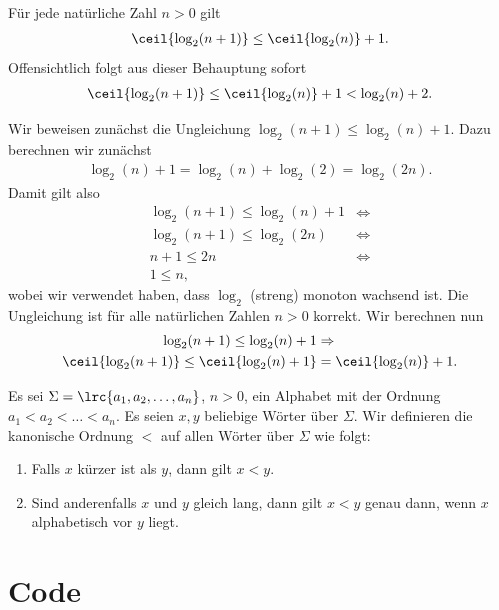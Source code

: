 \begin{mytheorem}\label{mytheorem:Estimate}
	Für jede natürliche Zahl $n>0$ gilt
	\begin{align*}
		\ceil{\log_2(n+1)}\leq \ceil{\log_2(n)} + 1.
	\end{align*}
	Offensichtlich folgt aus dieser Behauptung sofort
	\begin{align*}
		\ceil{\log_2(n+1)}\leq \ceil{\log_2(n)} + 1 < \log_2(n) + 2.
	\end{align*}
	\begin{myproof}
		Wir beweisen zunächst die Ungleichung $\log_2(n+1) \leq \log_2(n) + 1$. Dazu berechnen wir zunächst
		\begin{align*}
			\log_2(n) + 1 = \log_2(n) + \log_2(2) = \log_2(2n).
		\end{align*}
		Damit gilt also
		\begin{align*}
			\log_2(n+1) \leq \log_2(n) + 1 & \iff \\
			\log_2(n+1) \leq \log_2(2n)    & \iff \\
			n + 1\leq 2n                   & \iff \\
			1 \leq n,
		\end{align*}
		wobei wir verwendet haben, dass $\log_2$ (streng) monoton wachsend ist. Die Ungleichung ist für alle natürlichen Zahlen $n>0$ korrekt.
		Wir berechnen nun
		\begin{align*}
			\log_2(n+1) \leq \log_2(n) + 1               & \Rightarrow             \\
			\ceil{\log_2(n+1)} \leq \ceil{\log_2(n) + 1} & = \ceil{\log_2(n)} + 1.
		\end{align*}
	\end{myproof}
\end{mytheorem}

\begin{mydefinition}
	Es sei $\Sigma = \lrc{a_1, a_2 , \ldots, a_n}$, $n > 0$, ein Alphabet mit der Ordnung $a_1 < a_2 < \ldots < a_n$. Es seien $x, y$ beliebige Wörter über $\Sigma$. Wir definieren die kanonische Ordnung $<$ auf allen Wörter über $\Sigma$ wie folgt:
	\begin{enumerate}
		\item Falls $x$ kürzer ist als $y$, dann gilt $x < y$.
		\item Sind anderenfalls $x$ und $y$ gleich lang, dann gilt $x < y$ genau dann, wenn $x$ alphabetisch vor $y$ liegt.
	\end{enumerate}
\end{mydefinition}

\section{Code}


